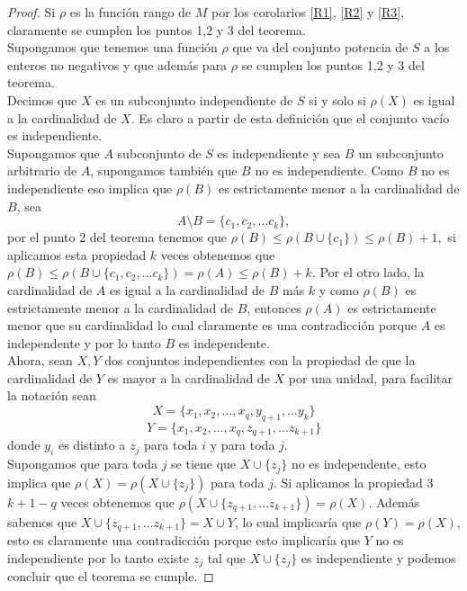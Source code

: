 \begin{proof}
Si $\rho $ es la función rango de $M$ por los corolarios \ref{R1}, \ref{R2} y \ref{R3}, claramente se cumplen los puntos 1,2 y 3 del teorema. \\
Supongamos que tenemos una función $\rho$ que va del conjunto potencia de $S$ a los enteros no negativos y que además para $\rho$ se cumplen los puntos 1,2 y 3 del teorema. \\
Decimos que $X$ es un subconjunto independiente de $S$ si y solo si $\rho(X)$ es igual a la cardinalidad de $X$. Es claro a partir de esta definición que el conjunto vacío es independiente. \\
Supongamos que $A$ subconjunto de $S$ es independiente y sea $B$ un subconjunto arbitrario de $A$, supongamos también que $B$ no es independiente. Como $B$ no es independiente eso implica que $\rho(B)$ es estrictamente menor a la cardinalidad de $B$, sea 
$$A \setminus B = \{ c_1, c_2, \dots c_k\},$$
por el punto 2 del teorema tenemos que $\rho(B) \leq \rho(B \cup \{c_1\}) \leq \rho(B)+1,$ si aplicamos esta propiedad $k$ veces obtenemos que $\rho(B) \leq \rho(B \cup \{ c_1, c_2, \dots c_k\}) = \rho(A) \leq \rho(B)+k.$ Por el otro lado, la cardinalidad de $A$ es igual a la cardinalidad de $B$ más $k$ y como $\rho(B)$ es estrictamente menor a la cardinalidad de $B$, entonces $\rho(A)$ es estrictamente menor que su cardinalidad lo cual claramente es una contradicción porque $A$ es independente y por lo tanto $B$ es independente. \\
Ahora, sean $X,Y$ dos conjuntos independientes con la propiedad de que la cardinalidad de $Y$ es mayor a la cardinalidad de $X$ por una unidad, para facilitar la notación sean 
$$X = \{ x_1,x_2,\dots, x_q, y_{q+1}, \dots y_k\}$$
$$Y = \{ x_1,x_2,\dots, x_q, z_{q+1}, \dots z_{k+1}\}$$
donde $y_i$ es distinto a $z_j$ para toda $i$ y para toda $j$. \\
Supongamos que para toda $j$ se tiene que $X \cup \{z_j\}$ no es independente, esto implica que $\rho(X) =\rho(X \cup \{z_j\})$ para toda $j$. Si aplicamos la propiedad 3 $k+1-q$ veces obtenemos que $\rho(X \cup \{ z_{q+1}, \dots z_{k+1} \} )= \rho(X)$. Además sabemos que $X \cup \{ z_{q+1}, \dots z_{k+1} \}= X \cup Y$, lo cual implicaría que $\rho(Y) = \rho (X)$, esto es claramente una contradicción porque esto implicaría que $Y$ no es independiente por lo tanto existe $z_j$ tal que $X \cup \{z_j\}$ es independiente y podemos concluir que el teorema se cumple.
\end{proof}

